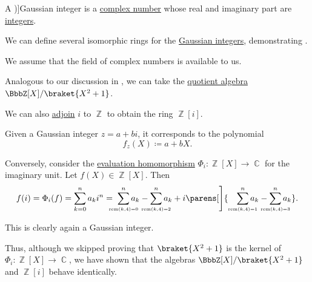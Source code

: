 \begin{definition}\label{def:gaussian_integers}
  A \term[ru=целые гауссовые числа (\cite[example 3.5.1]{Винберг2014КурсАлгебры})]{Gaussian integer} is a \hyperref[def:complex_numbers]{complex number} whose real and imaginary part are \hyperref[def:integers]{integers}.
\end{definition}

\begin{example}\label{ex:gaussian_integers}
  We can define several isomorphic rings for the \hyperref[def:gaussian_integers]{Gaussian integers}, demonstrating .

  We assume that the field of complex numbers is available to us.

  \begin{thmenum}
     Analogous to our discussion in , we can take the \hyperref[def:algebra_over_ring/quotient]{quotient algebra} \( \BbbZ[X] / \braket{X^2 + 1} \).

     We can also \hyperref[def:semiring_adjunction]{adjoin} \( i \) to \( \BbbZ \) to obtain the ring \( \BbbZ[i] \).

    Given a Gaussian integer \( z = a + bi \), it corresponds to the polynomial
    \begin{equation*}
      f_z(X) \coloneqq a + bX.
    \end{equation*}

    Conversely, consider the \hyperref[con:evaluation_homomorphism]{evaluation homomorphism} \( \Phi_i: \BbbZ[X] \to \BbbC \) for the imaginary unit. Let \( f(X) \in \BbbZ[X] \). Then
    \begin{equation*}
      f(i)
      =
      \Phi_i(f)
      =
      \sum_{k=0}^n a_k i^n
      =
      \thickspace \sum_{\scriptscriptstyle{\mathclap{\rem(k, 4) = 0}}}^n a_k - \sum_{\scriptscriptstyle{\mathclap{\rem(k, 4) = 2}}}^n a_k + i \parens[\Bigg]{ \quad \sum_{\scriptscriptstyle{\mathclap{\rem(k, 4) = 1}}}^n a_k - \sum_{\scriptscriptstyle{\mathclap{\rem(k, 4) = 3}}}^n a_k }.
    \end{equation*}

    This is clearly again a Gaussian integer.

    Thus, although we skipped proving that \( \braket{X^2 + 1} \) is the kernel of \( \Phi_i: \BbbZ[X] \to \BbbC \), we have shown that the algebras \( \BbbZ[X] / \braket{ X^2 + 1 } \) and \( \BbbZ[i] \) behave identically.
  \end{thmenum}
\end{example}

